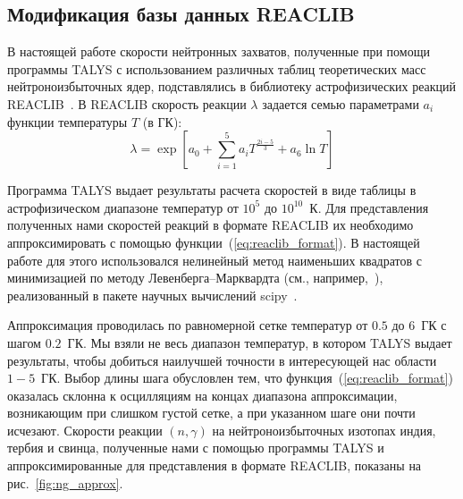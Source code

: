 \subsection{Модификация базы данных REACLIB} \label{sec:ratelib}
В настоящей работе скорости нейтронных захватов, полученные при помощи программы TALYS с использованием различных таблиц теоретических масс нейтроноизбыточных ядер, подставлялись в библиотеку астрофизических реакций REACLIB~\cite{reaclib2010}. В REACLIB скорость реакции $\lambda$ задается семью параметрами $a_i$ функции температуры $T$ (в ГК):
\begin{equation}
    \lambda = \exp \left[ a_0 + \sum_{i=1}^5 a_i T^{\frac{2i-5}{3}} + a_6 \ln T \right]
    \label{eq:reaclib_format}
\end{equation}

Программа TALYS выдает результаты расчета скоростей в виде таблицы в астрофизическом диапазоне температур от $10^5$ до $10^{10}$~К. Для представления полученных нами скоростей реакций в формате REACLIB их необходимо аппроксимировать с помощью функции~(\ref{eq:reaclib_format}). В настоящей работе для этого использовался нелинейный метод наименьших квадратов с минимизацией по методу Левенберга--Марквардта (см., например,~\cite{levenberg1944}), реализованный в пакете научных вычислений scipy~\cite{scipy2020}. 

Аппроксимация проводилась по равномерной сетке температур от $0.5$ до $6$~ГК с шагом $0.2$~ГК. Мы взяли не весь диапазон температур, в котором TALYS выдает результаты, чтобы добиться наилучшей точности в интересующей нас области $1-5$~ГК. Выбор длины шага обусловлен тем, что функция~(\ref{eq:reaclib_format}) оказалась склонна к осцилляциям на концах диапазона аппроксимации, возникающим при слишком густой сетке, а при указанном шаге они почти исчезают. Скорости реакции $(n,\gamma)$ на нейтроноизбыточных изотопах индия, тербия и свинца, полученные нами с помощью программы TALYS и аппроксимированные для представления в формате REACLIB, показаны на рис.~\ref{fig:ng_approx}. 

